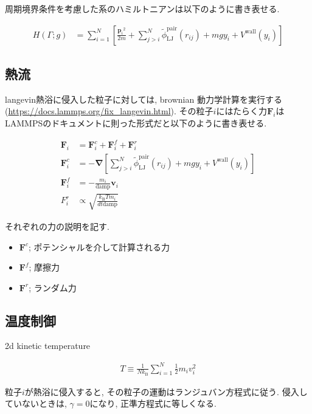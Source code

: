 \documentclass[dvipdfmx]{jsarticle}
\numberwithin{equation}{subsection}
\begin{document}
周期境界条件を考慮した系のハミルトニアンは以下のように書き表せる.

\begin{align}
  \label{Hamiltonian}
    H(\Gamma; g)
    &= \sum_{i=1}^{N}
    \left[
      \frac{{\bm{p}_i}^2}{2m} 
      + \sum_{j > i}^{N}
        \tilde{\phi}_{\text{LJ}}^{\text{pair}}(r_{ij})
      + mgy_i +V^{\text{wall}}(y_i)
    \right]
\end{align}



\subsection{熱流}

langevin熱浴に侵入した粒子に対しては, brownian 動力学計算を実行する(\url{https://docs.lammps.org/fix_langevin.html}). その粒子$i$にはたらく力$\bm{F}_i$はLAMMPSのドキュメントに則った形式だと以下のように書き表せる.

\begin{align}
  \bm{F}_i &= \bm{F}_i^c + \bm{F}_i^f + \bm{F}_i^r \\
  \bm{F}_i^c &= - \bm{\nabla} 
  \left[
    \sum_{j > i}^{N}
        \tilde{\phi}_{\text{LJ}}^{\text{pair}}(r_{ij})
      + mgy_i +V^{\text{wall}}(y_i)
  \right]  \\
  \bm{F}_i^f &= -\frac{m_i}{\text{damp}}\bm{v}_i \\
  F_i^r &\propto \sqrt{\frac{k_\text{B} Tm_i}{dt \text{damp}}}
\end{align}

それぞれの力の説明を記す.

\begin{itemize}
  \item $\bm{F}^c$; ポテンシャルを介して計算される力
  \item $\bm{F}^f$; 摩擦力
  \item $\bm{F}^r$; ランダム力
\end{itemize}

\subsection{温度制御}


2d kinetic temperature

\begin{align}
  T \equiv \frac{1}{Nk_{\text{B}}}\sum_{i=1}^{N} \frac{1}{2}m_i v_{i}^2
\end{align}

粒子$i$が熱浴に侵入すると, その粒子の運動はランジュバン方程式に従う. 侵入していないときは, $\gamma = 0$になり, 正準方程式に等しくなる.
\end{document}
